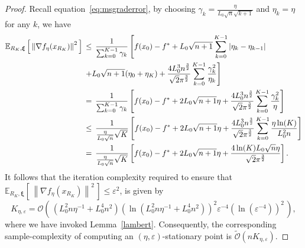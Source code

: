 \documentclass[11pt,reqno]{amsart}
\newcommand{\1}{{\bf 1}}
\newcommand{\2}{{\bf 2}}
\newcommand{\us}[1]{\textcolor{red}{#1}}
\newcommand{\bxi}{\boldsymbol{\xi}}
\numberwithin{equation}{section}
\theoremstyle{remark}
\begin{document}
{		\begin{proof} 
		Recall equation~\eqref{eq:msgraderror}, by choosing $\gamma_k = \frac{\eta}{L_0 \sqrt{n}\sqrt{k+1}}$ and $\eta_k = \eta$ for any $k$, we have 
		\begin{align}\label{eq:msefetak2}
			\notag
			\mathbb{E}_{R_K,\bxi}\left[\, \left\|\nabla f_{\eta}(x_{R_K})\right\|^2\, \right]  \, & \leq \, \frac{1}{\sum_{k=0}^{K-1}\gamma_k} \left[f(x_0)-f^*+L_0\sqrt{n+1}\sum_{k=0}^{K-1}|\eta_k-\eta_{k-1}|\right. \\
			~~~~&\left. + L_0\sqrt{n+1}(\eta_0+\eta_K) +\frac{4L_0^3n^{\frac{3}{2}}}{\sqrt{2}\pi^{\frac{3}{2}}}\sum_{k=0}^{K-1}\frac{\gamma_k^2}{\eta_k} \right] \nonumber\\
			\notag& = \, \frac{1}{\sum_{k=0}^{K-1}\gamma_k} \left[f(x_0)-f^*+ 2L_0\sqrt{n+1}\eta +\frac{4L_0^3n^{\frac{3}{2}}}{\sqrt{2}\pi^{\frac{3}{2}}}\sum_{k=0}^{K-1}\frac{\gamma_k^2}{\eta} \right] \\
			\notag  & \le \, \frac{1}{ \frac{\eta}{L_0 \sqrt{n} }\sqrt{K}} \left[f(x_0)-f^*+ 2L_0\sqrt{n+1}\eta +\frac{4L_0^3n^{\frac{3}{2}}}{\sqrt{2}\pi^{\frac{3}{2}}}\sum_{k=0}^{K-1}\frac{\eta \ln(K)}{L_0^2n} \right] \\
			& = \, \frac{1}{ \frac{\eta}{L_0 \sqrt{n} }\sqrt{K}} \left[f(x_0)-f^*+ 2L_0\sqrt{n+1}\eta +\frac{4\ln(K)L_0\sqrt{n} \eta}{\sqrt{2}\pi^{\frac{3}{2}}} \right].
		\end{align}
		It follows that the iteration complexity required to ensure that  $\mathbb{E}_{R_K,\bxi}\left[\, \left\|\nabla f_{\eta}(x_{R_K})\right\|^2\, \right] \le \varepsilon^2$, is given by  %
		\begin{equation*}
			K_{\eta,\varepsilon} = \mathcal{O}\left(\, \left(L_0^2 n \eta^{-1} + L_0^4 n^2 \right)\left(\ln\left(L_0^2 n \eta^{-1} + L_0^4 n^2 \right)\right)^2 \varepsilon^{-4}\left(\ln(\varepsilon^{-4})\right)^2\, \right),  
		\end{equation*}
		where we have invoked Lemma~\ref{lambert}. Consequently, the corresponding sample-complexity of computing an $(\eta,\varepsilon)$-stationary point 
		is $\tilde{\mathcal{O}}(nK_{\eta,\varepsilon}). $
		\end{proof}
}
\end{document}
